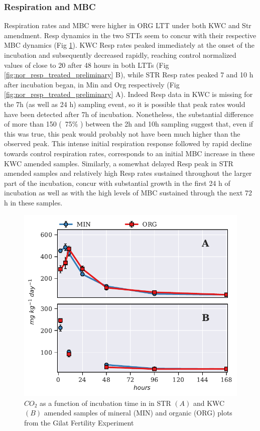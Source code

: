         \subsubsection{Respiration and MBC}
			Respiration rates and MBC were higher in ORG LTT under both KWC and Str amendment.
            Resp dynamics in the two STTs seem to concur with their respective MBC dynamics (Fig \ref{fig:resp_treated_preliminary}). KWC Resp rates peaked immediately at the onset of the incubation and subsequently decreased rapidly, reaching control normalized values of close to 20 \respunit after 48 hours in both LTTs (Fig \ref{fig:nor_resp_treated_preliminary} B), while STR Resp rates peaked 7 and 10 h after incubation began, in Min and Org respectively (Fig \ref{fig:nor_resp_treated_preliminary} A). Indeed Resp data in KWC is missing for the 7h (as well as 24 h) sampling event, so it is possible that peak rates would have been detected after 7h of incubation. Nonetheless, the substantial difference of more than 150 \genericunit (~75$\%$ ) between the 2h and 10h sampling suggest that, even if this was true, this peak would probably not have been much higher than the observed peak. This intense initial respiration response followed by rapid decline towards control respiration rates, corresponds  to an initial MBC increase in these KWC amended samples. Similarly, a somewhat delayed Resp peak in STR amended samples and relatively high Resp rates sustained throughout the larger part of the incubation, concur with substantial growth in the first 24 h of incubation as well as with the high levels of MBC sustained through the next 72 h in these samples.\\
            	\begin{figure}[H]
            	\centering
            	\includegraphics[width=\linewidth]{thesis_figures/preliminary/treated/Resp.pdf}
            	\caption{$CO_2$ as a function of incubation time in in STR $\left(A\right)$ and KWC $\left(B\right)$ amended samples of mineral (MIN) and organic (ORG) plots from the Gilat Fertility Experiment}
            	\label{fig:resp_treated_preliminary}
            \end{figure}

